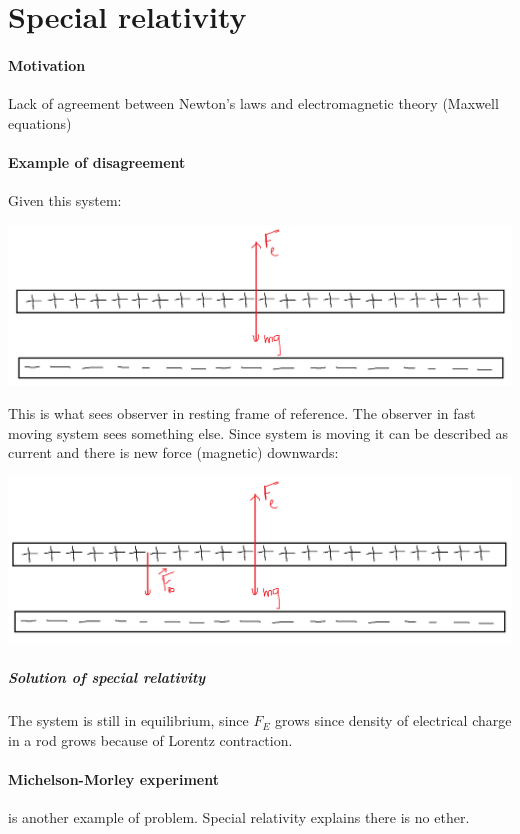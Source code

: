 \section{Special relativity}
\paragraph{Motivation} Lack of agreement between Newton's laws and electromagnetic theory (Maxwell equations)

\paragraph{Example of disagreement}
Given this system:
\begin{center}
	\includegraphics[width=\linewidth]{./lect20/pic1.png}
\end{center}

This is what sees observer in resting frame of reference. The observer in fast moving system sees something else. Since system is moving it can be described as current and there is new force (magnetic) downwards: 


\begin{center}
	\includegraphics[width=\linewidth]{./lect20/pic2.png}
\end{center}

\subparagraph{Solution of special relativity}
The system is still in equilibrium, since $F_E$ grows since density of electrical charge in a rod grows because of Lorentz contraction.

\paragraph{Michelson-Morley experiment} is another example of problem. Special relativity explains there is no ether.

